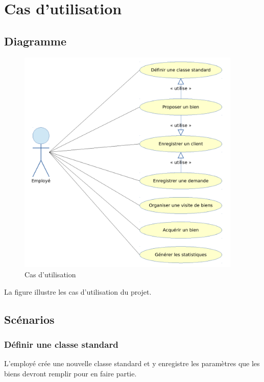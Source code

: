\chapter{Cas d'utilisation}

\section{Diagramme}

\begin{figure}
  \centering
  \includegraphics[width=0.95\textwidth]{IMG/uc}
  \caption{Cas d'utilisation}
  \label{img_uc}
\end{figure}

La figure  illustre les cas d'utilisation du projet.

\section{Scénarios}

\subsection{Définir une classe standard}

L'employé crée une nouvelle classe standard et y enregistre les paramètres que les biens devront remplir pour en faire partie.

